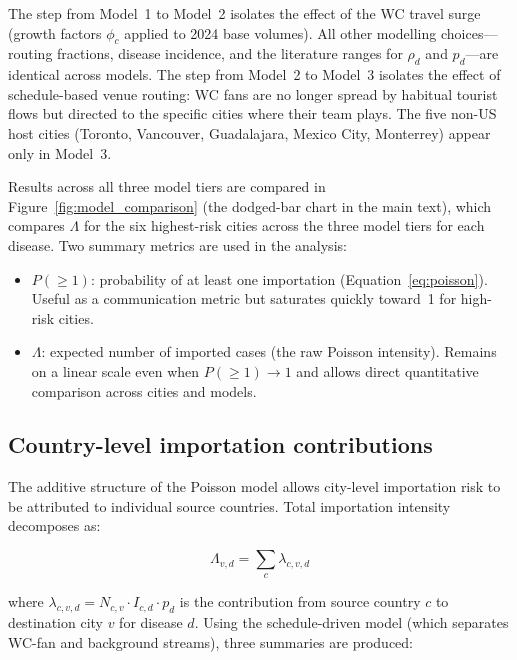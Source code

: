 \documentclass[12pt]{article}
\begin{document}
The step from Model~1 to Model~2 isolates the effect of the WC travel
surge (growth factors $\phi_c$ applied to 2024 base volumes). All
other modelling choices---routing fractions, disease incidence,
and the literature ranges for $\rho_d$ and $p_d$---are identical across models.
The step from Model~2 to Model~3 isolates the effect of schedule-based
venue routing: WC fans are no longer spread by habitual tourist flows
but directed to the specific cities where their team plays. The five
non-US host cities (Toronto, Vancouver, Guadalajara, Mexico City,
Monterrey) appear only in Model~3.

Results across all three model tiers are compared in
Figure~\ref{fig:model_comparison} (the dodged-bar chart in the main text),
which compares $\Lambda$ for the six highest-risk cities across the
three model tiers for each disease. Two summary metrics are used in
the analysis:
\begin{itemize}
  \item $P(\geq 1)$: probability of at least one importation
    (Equation~\ref{eq:poisson}). Useful as a communication metric but
    saturates quickly toward~1 for high-risk cities.
  \item $\Lambda$: expected number of imported cases (the raw Poisson
    intensity). Remains on a linear scale even when $P(\geq 1) \to 1$
    and allows direct quantitative comparison across cities and models.
\end{itemize}

\subsection*{Country-level importation contributions}

The additive structure of the Poisson model allows city-level
importation risk to be attributed to individual source countries.
Total importation intensity decomposes as:

\begin{equation}
  \Lambda_{v,d} = \sum_c \lambda_{c,v,d}
  \label{eq:decompose}
\end{equation}

where $\lambda_{c,v,d} = N_{c,v} \cdot I_{c,d} \cdot p_d$ is the
contribution from source country $c$ to destination city $v$ for
disease $d$. Using the schedule-driven model (which separates WC-fan
and background streams), three summaries are produced:
\end{document}
